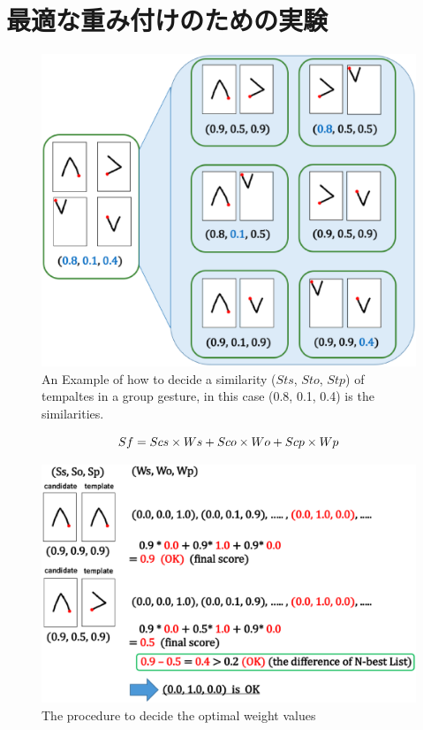 
\section{最適な重み付けのための実験}
\begin{figure} [h!]
	\begin{center}
		\includegraphics [width=0.8\hsize ]{img/group_similarity.eps}
	\end{center}
	\caption{An Example of how to decide a similarity ($Sts$, $Sto$, $Stp$) of tempaltes in a group gesture, in this case (0.8, 0.1, 0.4) is the similarities.}
	\label{fig:group_similarity}
\end{figure}

\begin{equation}
S{\tiny f} = S{\scriptsize cs} \times W{\scriptsize s} + S{\scriptsize co} \times W{\scriptsize o} + S{\scriptsize cp} \times W{\scriptsize p}
\end{equation}

\begin{figure} [h!]
	\begin{center}
		\includegraphics [width=0.8\hsize ]{img/weight_method1.eps}
	\end{center}
	\caption{The procedure to decide the optimal weight values }
	\label{fig:weight_method1}
\end{figure}

